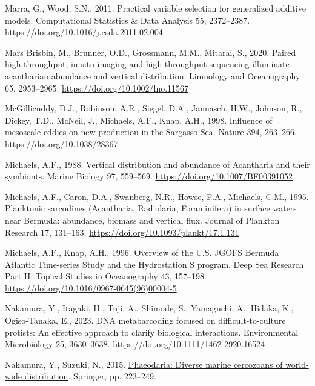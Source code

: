 \documentclass[
]{article}
\newlength{\cslhangindent}
\newenvironment{CSLReferences}[2] %
 {\begin{list}{}{%
  \setlength{\itemindent}{0pt}
  \setlength{\leftmargin}{0pt}
  \setlength{\parsep}{0pt}
  \ifodd #1
   \setlength{\leftmargin}{\cslhangindent}
   \setlength{\itemindent}{-1\cslhangindent}
  \fi
  \setlength{\itemsep}{#2\baselineskip}}}
 {\end{list}}
\begin{document}
\begin{CSLReferences}{1}{0}
Marra, G., Wood, S.N., 2011. Practical variable selection for
generalized additive models. Computational Statistics \& Data Analysis
55, 2372--2387. \url{https://doi.org/10.1016/j.csda.2011.02.004}

Mars Brisbin, M., Brunner, O.D., Grossmann, M.M., Mitarai, S., 2020.
Paired high-throughput, in situ imaging and high-throughput sequencing
illuminate acantharian abundance and vertical distribution. Limnology
and Oceanography 65, 2953--2965. \url{https://doi.org/10.1002/lno.11567}

McGillicuddy, D.J., Robinson, A.R., Siegel, D.A., Jannasch, H.W.,
Johnson, R., Dickey, T.D., McNeil, J., Michaels, A.F., Knap, A.H., 1998.
Influence of mesoscale eddies on new production in the Sargasso Sea.
Nature 394, 263--266. \url{https://doi.org/10.1038/28367}

Michaels, A.F., 1988. Vertical distribution and abundance of Acantharia
and their symbionts. Marine Biology 97, 559--569.
\url{https://doi.org/10.1007/BF00391052}

Michaels, A.F., Caron, D.A., Swanberg, N.R., Howse, F.A., Michaels,
C.M., 1995. Planktonic sarcodines (Acantharia, Radiolaria, Foraminifera)
in surface waters near Bermuda: abundance, biomass and vertical flux.
Journal of Plankton Research 17, 131--163.
\url{https://doi.org/10.1093/plankt/17.1.131}

Michaels, A.F., Knap, A.H., 1996. Overview of the U.S. JGOFS Bermuda
Atlantic Time-series Study and the Hydrostation S program. Deep Sea
Research Part II: Topical Studies in Oceanography 43, 157--198.
\url{https://doi.org/10.1016/0967-0645(96)00004-5}

Nakamura, Y., Itagaki, H., Tuji, A., Shimode, S., Yamaguchi, A., Hidaka,
K., Ogiso-Tanaka, E., 2023. DNA metabarcoding focused on
difficult-to-culture protists: An effective approach to clarify
biological interactions. Environmental Microbiology 25, 3630--3638.
\url{https://doi.org/10.1111/1462-2920.16524}

Nakamura, Y., Suzuki, N., 2015.
\href{https://link.springer.com/chapter/10.1007/978-4-431-55130-0_9}{Phaeodaria:
Diverse marine cercozoans of world-wide distribution}. Springer, pp.
223--249.


\end{CSLReferences}
\end{document}
